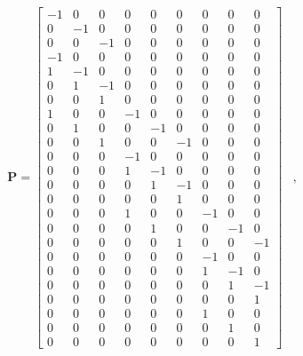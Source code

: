 \begin{example}
\[
   \begin{array}{ll}
	
	\mathbf{P} = \left[ \begin{array}{ccccccccc}
	 -1 & 0 & 0 & 0 & 0 & 0 & 0 & 0 & 0 \\
	 0 & -1 & 0 & 0 & 0 & 0 & 0 & 0 & 0 \\	 
	 0 & 0 & -1 & 0 & 0 & 0 & 0 & 0 & 0 \\	 
	 -1 & 0 & 0 & 0 & 0 & 0 & 0 & 0 & 0 \\	 
	 1 & -1 & 0 & 0 & 0 & 0 & 0 & 0 & 0 \\	 
	 0 & 1 & -1 & 0 & 0 & 0 & 0 & 0 & 0 \\	 
	 0 & 0 & 1 & 0 & 0 & 0 & 0 & 0 & 0 \\	 
	 1 & 0 & 0 & -1 & 0 & 0 & 0 & 0 & 0 \\	 
	 0 & 1 & 0 & 0 & -1 & 0 & 0 & 0 & 0 \\	 
	 0 & 0 & 1 & 0 & 0 & -1 & 0 & 0 & 0 \\	 
	 0 & 0 & 0 & -1 & 0 & 0 & 0 & 0 & 0 \\	 
	 0 & 0 & 0 & 1 & -1 & 0 & 0 & 0 & 0 \\	 
	 0 & 0 & 0 & 0 & 1 & -1 & 0 & 0 & 0 \\	 
	 0 & 0 & 0 & 0 & 0 & 1 & 0 & 0 & 0 \\	 
	 0 & 0 & 0 & 1 & 0 & 0 & -1 & 0 & 0 \\	 
	 0 & 0 & 0 & 0 & 1 & 0 & 0 & -1 & 0 \\	 
	 0 & 0 & 0 & 0 & 0 & 1 & 0 & 0 & -1 \\	 
	 0 & 0 & 0 & 0 & 0 & 0 & -1 & 0 & 0 \\	 
	 0 & 0 & 0 & 0 & 0 & 0 & 1 & -1 & 0 \\	 
	 0 & 0 & 0 & 0 & 0 & 0 & 0 & 1 & -1 \\	 
	 0 & 0 & 0 & 0 & 0 & 0 & 0 & 0 & 1 \\	 
	 0 & 0 & 0 & 0 & 0 & 0 & 1 & 0 & 0 \\	 
	 0 & 0 & 0 & 0 & 0 & 0 & 0 & 1 & 0 \\	 
	 0 & 0 & 0 & 0 & 0 & 0 & 0 & 0 & 1	 	 	 	 	 	 	 		\end{array}\right] &, \qquad
	 

\end{array}\]
\end{example}
